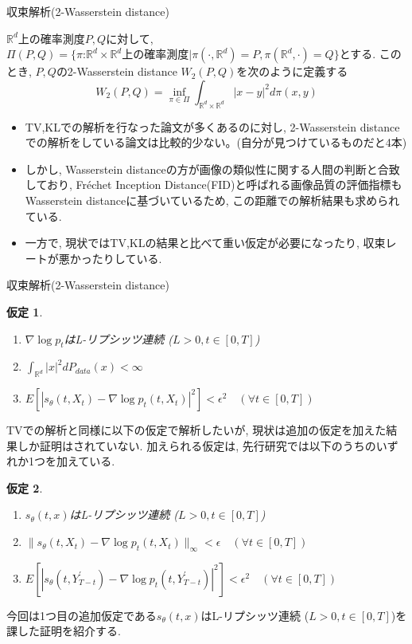 \documentclass[dvipdfmx,11pt]{beamer}
\theoremstyle{plain}
\newtheorem{assumption}{仮定}
\theoremstyle{定義}
\begin{document}
  \begin{frame}{収束解析(2-Wasserstein distance)}
    \begin{definition}
      $\mathbb{R}^d$上の確率測度$P,Q$に対して, $\Pi(P,Q)=\{\pi\text{:}\mathbb{R}^d\times\mathbb{R}^d\text{上の確率測度}|\pi(\cdot,\mathbb{R}^d)=P,\pi(\mathbb{R}^d,\cdot)=Q\}$とする.
      このとき, $P,Q$の2-Wasserstein distance $W_2(P,Q)$を次のように定義する
      \begin{equation*}
        W_2(P,Q)=\inf_{\pi\in\Pi}\int_{\mathbb{R}^d\times\mathbb{R}^d}|x-y|^2d\pi(x,y)
      \end{equation*}
    \end{definition}
    \begin{itemize}
      \item TV,KLでの解析を行なった論文が多くあるのに対し, 2-Wasserstein distanceでの解析をしている論文は比較的少ない。(自分が見つけているものだと4本)
      \item しかし, Wasserstein distanceの方が画像の類似性に関する人間の判断と合致しており, Fréchet Inception Distance(FID)と呼ばれる画像品質の評価指標もWasserstein distanceに基づいているため, この距離での解析結果も求められている.
      \item 一方で, 現状ではTV,KLの結果と比べて重い仮定が必要になったり, 収束レートが悪かったりしている.
    \end{itemize}
  \end{frame}
  
  \begin{frame}{収束解析(2-Wasserstein distance)}
    \begin{assumption}
      \begin{enumerate}
        \item $\nabla \log{p_t}$はL-リプシッツ連続  ($L>0, t\in [0,T]$)
        \item $\int_{\mathbb{R}^d}|x|^2dP_{data}(x)<\infty$
        \item $E[|s_\theta(t,X_t)-\nabla\log{p_t(t,X_t)}|^2]<\epsilon^2 \quad (\forall t\in [0,T])$
      \end{enumerate}
    \end{assumption}
    TVでの解析と同様に以下の仮定で解析したいが, 現状は追加の仮定を加えた結果しか証明はされていない.
    加えられる仮定は, 先行研究では以下のうちのいずれか1つを加えている.
    \begin{assumption}
      \begin{enumerate}
        \item $s_\theta(t,x)$はL-リプシッツ連続  ($L>0, t\in [0,T]$)
        \item $\|s_\theta(t,X_t)-\nabla\log{p_t(t,X_t)}\|_{\infty}<\epsilon \quad (\forall t\in [0,T])$
        \item $E[|s_\theta(t,Y^{\prime}_{T-t})-\nabla\log{p_t(t,Y^{\prime}_{T-t})}|^2]<\epsilon^2 \quad (\forall t\in [0,T])$
      \end{enumerate}
    \end{assumption}
    今回は1つ目の追加仮定である$s_\theta(t,x)$はL-リプシッツ連続  ($L>0, t\in [0,T]$)を課した証明を紹介する.

  \end{frame}
\end{document}
